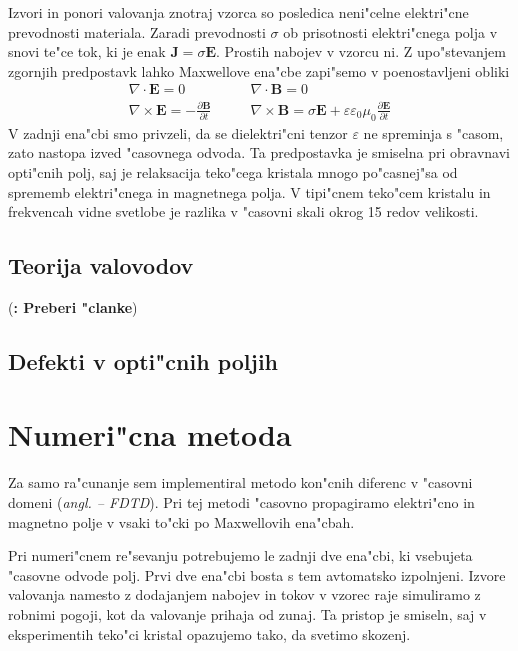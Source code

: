 \documentclass[a4paper,10pt]{article}
\newcommand{\todo}[1]{(\textbf{\textsmaller{TODO}: #1})}
\newcommand{\odvod}[2]{\frac{\partial #1}{\partial #2}}
\renewcommand{\vec}{\mathbf}
\newcommand{\angl}[1]{(\textit{angl. #1})}
\renewcommand{\acf}[1]{\aclu{#1} -- \acs{#1}}
\begin{document}
Izvori in ponori valovanja znotraj vzorca so posledica neni"celne elektri"cne prevodnosti materiala.
Zaradi prevodnosti $\sigma$ ob prisotnosti elektri"cnega polja v snovi te"ce tok, ki je enak $\vec J = \sigma \vec E$. 
Prostih nabojev v vzorcu ni. Z upo"stevanjem zgornjih predpostavk lahko Maxwellove ena"cbe zapi"semo v poenostavljeni obliki
\begin{equation}
  \begin{aligned}
  \nabla \cdot \vec E = 0 & \qquad \nabla \cdot \vec B = 0 \\
  \nabla \times \vec E = -\odvod{\vec B}{t} & \qquad \nabla \times \vec B = \sigma \vec E + \varepsilon\varepsilon_0\mu_0\odvod{\vec E}{t}
  \end{aligned}
\end{equation}
V zadnji ena"cbi smo privzeli, da se dielektri"cni tenzor $\varepsilon$ ne spreminja s "casom, zato nastopa izved "casovnega odvoda. 
Ta predpostavka je smiselna pri obravnavi opti"cnih polj, saj je relaksacija teko"cega kristala mnogo po"casnej"sa od sprememb elektri"cnega in magnetnega polja. 
V tipi"cnem teko"cem kristalu in frekvencah vidne svetlobe je razlika v "casovni skali okrog 15 redov velikosti. 

\subsection{Teorija valovodov}
\todo{Preberi "clanke}

\subsection{Defekti v opti"cnih poljih}

\section{Numeri"cna metoda}

Za samo ra"cunanje sem implementiral metodo kon"cnih diferenc v "casovni domeni \angl{\acf{FDTD}}\cite{taflove}. 
Pri tej metodi "casovno propagiramo elektri"cno in magnetno polje v vsaki to"cki po Maxwellovih ena"cbah. 

Pri numeri"cnem re"sevanju potrebujemo le zadnji dve ena"cbi, ki vsebujeta "casovne odvode polj. 
Prvi dve ena"cbi bosta s tem avtomatsko izpolnjeni. 
Izvore valovanja namesto z dodajanjem nabojev in tokov v vzorec raje simuliramo z robnimi pogoji, kot da valovanje prihaja od zunaj. 
Ta pristop je smiseln, saj v eksperimentih teko"ci kristal opazujemo tako, da svetimo skozenj. 
\end{document}
